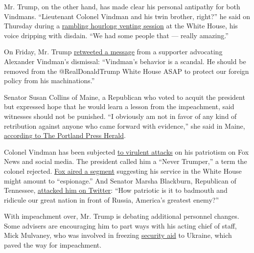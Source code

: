 Mr. Trump, on the other hand, has made clear his personal antipathy for
both Vindmans. ``Lieutenant Colonel Vindman and his twin brother,
right?'' he said on Thursday during a
\href{https://www.nytimes.com/2020/02/06/us/politics/trump-impeachment.html}{rambling
hourlong venting session} at the White House, his voice dripping with
disdain. ``We had some people that --- really amazing.''

On Friday, Mr. Trump
\href{https://twitter.com/TomFitton/status/1196980591398457346}{retweeted
a message} from a supporter advocating Alexander Vindman's dismissal:
``Vindman's behavior is a scandal. He should be removed from the
@RealDonaldTrump White House ASAP to protect our foreign policy from his
machinations.''

Senator Susan Collins of Maine, a Republican who voted to acquit the
president but expressed hope that he would learn a lesson from the
impeachment, said witnesses should not be punished. ``I obviously am not
in favor of any kind of retribution against anyone who came forward with
evidence,'' she said in Maine,
\href{https://www.pressherald.com/2020/02/07/collins-says-retribution-after-impeachment-acquital-would-not-be-appropriate/}{according
to The Portland Press Herald}.

Colonel Vindman has been subjected
\href{https://www.nytimes.com/2019/11/06/us/politics/trump-vindman-twitter.html}{to
virulent attacks} on his patriotism on Fox News and social media. The
president called him a ``Never Trumper,'' a term the colonel rejected.
\href{https://www.nytimes.com/2019/11/20/us/alexander-vindman-fox-news-espionage.html}{Fox
aired a segment} suggesting his service in the White House might amount
to ``espionage.'' And Senator Marsha Blackburn, Republican of Tennessee,
\href{https://twitter.com/MarshaBlackburn/status/1220452721616216087?ref_src=twsrc\%5Etfw\%7Ctwcamp\%5Etweetembed\%7Ctwterm\%5E1220452721616216087\&ref_url=https\%3A\%2F\%2Fwww.washingtonpost.com\%2Fpolitics\%2F2020\%2F01\%2F23\%2Fgop-senator-flimsily-impugns-key-impeachment-witness-again\%2F}{attacked
him on Twitter}: ``How patriotic is it to badmouth and ridicule our
great nation in front of Russia, America's greatest enemy?''

With impeachment over, Mr. Trump is debating additional personnel
changes. Some advisers are encouraging him to part ways with his acting
chief of staff, Mick Mulvaney, who was involved in freezing
\href{https://www.nytimes.com/2019/12/29/us/politics/trump-ukraine-military-aid.html}{security
aid} to Ukraine, which paved the way for impeachment.

